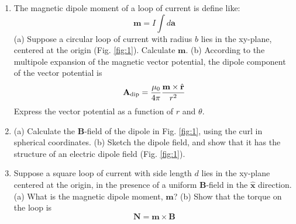 \documentclass[10pt]{article}
\begin{document}
\begin{enumerate}
\item The magnetic dipole moment of a loop of current is define like:
\begin{equation}
\mathbf{m} = I\int d\mathbf{a}
\end{equation}
(a) Suppose a circular loop of current with radius $b$ lies in the xy-plane, centered at the origin (Fig. \ref{fig:1}).  Calculate $\mathbf{m}$. (b) According to the multipole expansion of the magnetic vector potential, the dipole component of the vector potential is
\begin{equation}
\mathbf{A}_{\rm dip} = \frac{\mu_0}{4\pi}\frac{\mathbf{m}\times \hat{\mathbf{r}}}{r^2}
\end{equation}
Express the vector potential as a function of $r$ and $\theta$. \\ \vspace{4cm}
\item (a) Calculate the $\mathbf{B}$-field of the dipole in Fig. \ref{fig:1}, using the curl in spherical coordinates. (b) Sketch the dipole field, and show that it has the structure of an electric dipole field (Fig. \ref{fig:1}). \\ \vspace{4cm}
\item Suppose a square loop of current with side length $d$ lies in the xy-plane centered at the origin, in the presence of a uniform $\mathbf{B}$-field in the $\hat{\mathbf{x}}$ direction. (a) What is the magnetic dipole moment, $\mathbf{m}$? (b) Show that the torque on the loop is 
\begin{equation}
\mathbf{N} = \mathbf{m} \times \mathbf{B}
\end{equation}
\end{enumerate}
\end{document}

